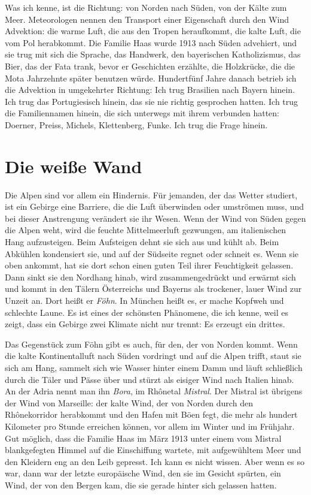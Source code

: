 \documentclass[
  ngerman,
  11pt,
  openany]{book}
\begin{document}
Was ich kenne, ist die Richtung: von Norden nach Süden, von der Kälte
zum Meer. Meteorologen nennen den Transport einer Eigenschaft durch den
Wind Advektion: die warme Luft, die aus den Tropen heraufkommt, die
kalte Luft, die vom Pol herabkommt. Die Familie Haas wurde 1913 nach
Süden advehiert, und sie trug mit sich die Sprache, das Handwerk, den
bayerischen Katholizismus, das Bier, das der Fata trank, bevor er
Geschichten erzählte, die Holzkrücke, die die Mota Jahrzehnte später
benutzen würde. Hundertfünf Jahre danach betrieb ich die Advektion in
umgekehrter Richtung: Ich trug Brasilien nach Bayern hinein. Ich trug
das Portugiesisch hinein, das sie nie richtig gesprochen hatten. Ich
trug die Familiennamen hinein, die sich unterwegs mit ihrem verbunden
hatten: Doerner, Preiss, Michels, Klettenberg, Funke. Ich trug die Frage
hinein.

\section{Die weiße Wand}\label{die-weiuxdfe-wand}

Die Alpen sind vor allem ein Hindernis. Für jemanden, der das Wetter
studiert, ist ein Gebirge eine Barriere, die die Luft überwinden oder
umströmen muss, und bei dieser Anstrengung verändert sie ihr Wesen. Wenn
der Wind von Süden gegen die Alpen weht, wird die feuchte Mittelmeerluft
gezwungen, am italienischen Hang aufzusteigen. Beim Aufsteigen dehnt sie
sich aus und kühlt ab. Beim Abkühlen kondensiert sie, und auf der
Südseite regnet oder schneit es. Wenn sie oben ankommt, hat sie dort
schon einen guten Teil ihrer Feuchtigkeit gelassen. Dann sinkt sie den
Nordhang hinab, wird zusammengedrückt und erwärmt sich und kommt in den
Tälern Österreichs und Bayerns als trockener, lauer Wind zur Unzeit an.
Dort heißt er \emph{Föhn}. In München heißt es, er mache Kopfweh und
schlechte Laune. Es ist eines der schönsten Phänomene, die ich kenne,
weil es zeigt, dass ein Gebirge zwei Klimate nicht nur trennt: Es
erzeugt ein drittes.

Das Gegenstück zum Föhn gibt es auch, für den, der von Norden kommt.
Wenn die kalte Kontinentalluft nach Süden vordringt und auf die Alpen
trifft, staut sie sich am Hang, sammelt sich wie Wasser hinter einem
Damm und läuft schließlich durch die Täler und Pässe über und stürzt als
eisiger Wind nach Italien hinab. An der Adria nennt man ihn \emph{Bora},
im Rhônetal \emph{Mistral}. Der Mistral ist übrigens der Wind von
Marseille: der kalte Wind, der von Norden durch den Rhônekorridor
herabkommt und den Hafen mit Böen fegt, die mehr als hundert Kilometer
pro Stunde erreichen können, vor allem im Winter und im Frühjahr. Gut
möglich, dass die Familie Haas im März 1913 unter einem vom Mistral
blankgefegten Himmel auf die Einschiffung wartete, mit aufgewühltem Meer
und den Kleidern eng an den Leib gepresst. Ich kann es nicht wissen.
Aber wenn es so war, dann war der letzte europäische Wind, den sie im
Gesicht spürten, ein Wind, der von den Bergen kam, die sie gerade hinter
sich gelassen hatten.
\end{document}
